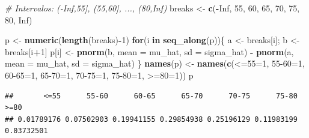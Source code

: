 \documentclass[
]{article}
\newenvironment{Shaded}{\begin{snugshade}}{\end{snugshade}}
\newcommand{\AttributeTok}[1]{\textcolor[rgb]{0.13,0.29,0.53}{#1}}
\newcommand{\CommentTok}[1]{\textcolor[rgb]{0.56,0.35,0.01}{\textit{#1}}}
\newcommand{\ConstantTok}[1]{\textcolor[rgb]{0.56,0.35,0.01}{#1}}
\newcommand{\ControlFlowTok}[1]{\textcolor[rgb]{0.13,0.29,0.53}{\textbf{#1}}}
\newcommand{\DecValTok}[1]{\textcolor[rgb]{0.00,0.00,0.81}{#1}}
\newcommand{\FunctionTok}[1]{\textcolor[rgb]{0.13,0.29,0.53}{\textbf{#1}}}
\newcommand{\NormalTok}[1]{#1}
\newcommand{\OtherTok}[1]{\textcolor[rgb]{0.56,0.35,0.01}{#1}}
\newcommand{\SpecialCharTok}[1]{\textcolor[rgb]{0.81,0.36,0.00}{\textbf{#1}}}
\newcommand{\StringTok}[1]{\textcolor[rgb]{0.31,0.60,0.02}{#1}}
\begin{document}
\begin{Shaded}
\begin{Highlighting}[]
\CommentTok{\# Intervalos: ({-}Inf,55], (55,60], ..., (80,Inf)}
\NormalTok{breaks }\OtherTok{\textless{}{-}} \FunctionTok{c}\NormalTok{(}\SpecialCharTok{{-}}\ConstantTok{Inf}\NormalTok{, }\DecValTok{55}\NormalTok{, }\DecValTok{60}\NormalTok{, }\DecValTok{65}\NormalTok{, }\DecValTok{70}\NormalTok{, }\DecValTok{75}\NormalTok{, }\DecValTok{80}\NormalTok{, }\ConstantTok{Inf}\NormalTok{)}

\NormalTok{p }\OtherTok{\textless{}{-}} \FunctionTok{numeric}\NormalTok{(}\FunctionTok{length}\NormalTok{(breaks)}\SpecialCharTok{{-}}\DecValTok{1}\NormalTok{)}
\ControlFlowTok{for}\NormalTok{(i }\ControlFlowTok{in} \FunctionTok{seq\_along}\NormalTok{(p))\{}
\NormalTok{  a }\OtherTok{\textless{}{-}}\NormalTok{ breaks[i]; b }\OtherTok{\textless{}{-}}\NormalTok{ breaks[i}\SpecialCharTok{+}\DecValTok{1}\NormalTok{]}
\NormalTok{  p[i] }\OtherTok{\textless{}{-}} \FunctionTok{pnorm}\NormalTok{(b, }\AttributeTok{mean =}\NormalTok{ mu\_hat, }\AttributeTok{sd =}\NormalTok{ sigma\_hat) }\SpecialCharTok{{-}} \FunctionTok{pnorm}\NormalTok{(a, }\AttributeTok{mean =}\NormalTok{ mu\_hat, }\AttributeTok{sd =}\NormalTok{ sigma\_hat)}
\NormalTok{\}}
\FunctionTok{names}\NormalTok{(p) }\OtherTok{\textless{}{-}} \FunctionTok{names}\NormalTok{(}\FunctionTok{c}\NormalTok{(}\StringTok{\textasciigrave{}}\AttributeTok{\textless{}=55}\StringTok{\textasciigrave{}}\OtherTok{=}\DecValTok{1}\NormalTok{, }\StringTok{\textasciigrave{}}\AttributeTok{55{-}60}\StringTok{\textasciigrave{}}\OtherTok{=}\DecValTok{1}\NormalTok{, }\StringTok{\textasciigrave{}}\AttributeTok{60{-}65}\StringTok{\textasciigrave{}}\OtherTok{=}\DecValTok{1}\NormalTok{, }\StringTok{\textasciigrave{}}\AttributeTok{65{-}70}\StringTok{\textasciigrave{}}\OtherTok{=}\DecValTok{1}\NormalTok{, }\StringTok{\textasciigrave{}}\AttributeTok{70{-}75}\StringTok{\textasciigrave{}}\OtherTok{=}\DecValTok{1}\NormalTok{, }\StringTok{\textasciigrave{}}\AttributeTok{75{-}80}\StringTok{\textasciigrave{}}\OtherTok{=}\DecValTok{1}\NormalTok{, }\StringTok{\textasciigrave{}}\AttributeTok{\textgreater{}=80}\StringTok{\textasciigrave{}}\OtherTok{=}\DecValTok{1}\NormalTok{))}
\NormalTok{p}
\end{Highlighting}
\end{Shaded}

\begin{verbatim}
##       <=55      55-60      60-65      65-70      70-75      75-80       >=80 
## 0.01789176 0.07502903 0.19941155 0.29854938 0.25196129 0.11983199 0.03732501
\end{verbatim}
\end{document}
